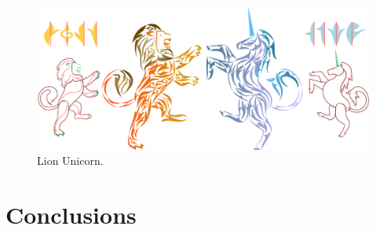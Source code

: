 \begin{figure}
\centering
\includegraphics[width=1.0\textwidth]{figures/flowpak/lion_unicorn.pdf} 
\caption{\label{fig_lion_unicorn} 
Lion Unicorn. }
\end{figure}



\section{Conclusions}